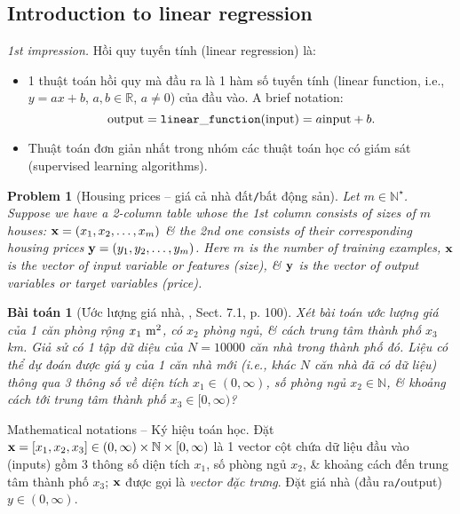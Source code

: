 \documentclass{article}
\newtheorem{baitoan}{Bài toán}
\newtheorem{problem}{Problem}
\begin{document}
\subsection{Introduction to linear regression}
{\it1st impression.} Hồi quy tuyến tính (linear regression) là:
\begin{itemize}
	\item 1 thuật toán hồi quy mà đầu ra là 1 hàm số tuyến tính (linear function, i.e., $y = ax + b$, $a,b\in\mathbb{R}$, $a\ne0$) của đầu vào. A brief notation:
	\begin{equation*}
		{\rm output} = {\tt linear\_function}({\rm input}) = a{\rm input} + b.
	\end{equation*}
	\item Thuật toán đơn giản nhất trong nhóm các thuật toán học có giám sát (supervised learning algorithms).
\end{itemize}

\begin{problem}[Housing prices -- giá cả nhà đất{\tt/}bất động sản]
	Let $m\in\mathbb{N}^\star$. Suppose we have a 2-column table whose the 1st column consists of sizes of $m$ houses: ${\bf x} = (x_1,x_2,\ldots,x_m)$ \& the 2nd one consists of their corresponding housing prices ${\bf y} = (y_1,y_2,\ldots,y_m)$. Here $m$ is the number of training examples, ${\bf x}$ is the vector of input variable or features (size), \& ${\bf y}$ is the vector of output variables or target variables (price).
\end{problem}

\begin{baitoan}[Ước lượng giá nhà, \cite{Tiep_ML_co_ban}, Sect. 7.1, p. 100]
	Xét bài toán ước lượng giá của 1 căn phòng rộng $x_1\ {\rm m}^2$, có $x_2$ phòng ngủ, \& cách trung tâm thành phố $x_3$ km. Giả sử có 1 tập dữ diệu của $N = 10000$ căn nhà trong thành phố đó. Liệu có thể dự đoán được giá $y$ của 1 căn nhà mới (i.e., khác $N$ căn nhà đã có dữ liệu) thông qua 3 thông số về diện tích $x_1\in(0,\infty)$, số phòng ngủ $x_2\in\mathbb{N}$, \& khoảng cách tới trung tâm thành phố $x_3\in[0,\infty)$?
\end{baitoan}
{\sf Mathematical notations -- Ký hiệu toán học.} Đặt ${\bf x} = [x_1,x_2,x_3]\in(0,\infty)\times\mathbb{N}\times[0,\infty)$ là 1 vector cột chứa dữ liệu đầu vào (inputs) gồm 3 thông số diện tích $x_1$, số phòng ngủ $x_2$, \& khoảng cách đến trung tâm thành phố $x_3$; ${\bf x}$ được gọi là {\it vector đặc trưng}. Đặt giá nhà (đầu ra{\tt/}output) $y\in(0,\infty)$.
\end{document}

